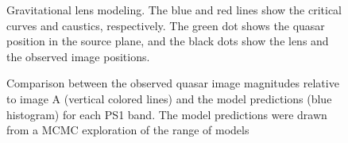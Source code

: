 \documentclass[manuscript]{aastex}
\begin{document}
\begin{figure}
\caption{
Gravitational lens modeling. The blue and red lines show the critical curves and caustics, respectively. The green dot shows the quasar position in the source plane, and the black dots show the lens and the observed image positions.}
\label{model}
\end{figure}



\begin{figure}
\caption{
Comparison between the observed quasar image magnitudes relative to image A (vertical colored lines) and the model predictions (blue histogram) for each PS1 band. The model predictions were drawn from a MCMC exploration of the range of models}
\label{modelphot}
\end{figure}
\end{document}
